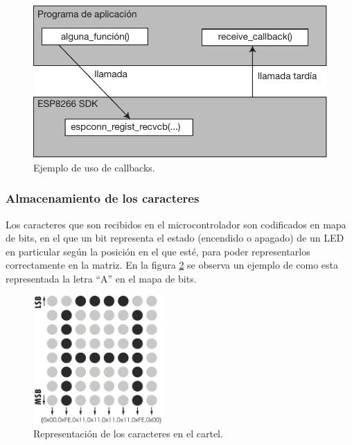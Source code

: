 \begin{figure}[ht!]
	\begin{center}
		\centering
		\includegraphics[scale=0.8]{imagenes/callbacks.pdf}
		\caption{Ejemplo de uso de callbacks.}
		\label{fig:callbacks}
	\end{center}
\end{figure}

\subsubsection{Almacenamiento de los caracteres}

Los caracteres que son recibidos en el microcontrolador son codificados en mapa de bits, en el que un bit representa el estado (encendido o apagado) de un LED en particular según la posición en el que esté, para poder representarlos correctamente en la matriz. En la figura \ref{fig:repAscii} se observa un ejemplo de como esta representada la letra \enquote{A} en el mapa de bits.

\begin{figure}[h!]
    \centering
    \includegraphics[width=0.44\textwidth]{imagenes/codificacionAscii.pdf}
    \caption{Representación de los caracteres en el cartel.}
    \label{fig:repAscii}
\end{figure}

